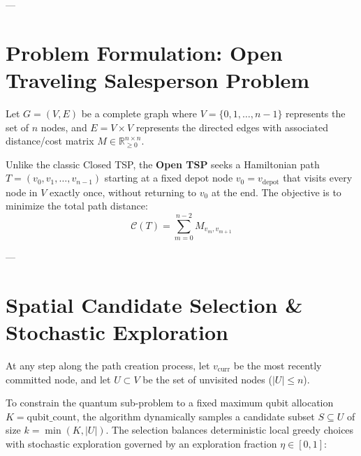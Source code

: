 \documentclass[11pt,a4paper]{article}
\begin{document}
---

\section{Problem Formulation: Open Traveling Salesperson Problem}

Let $G = (V, E)$ be a complete graph where $V = \{0, 1, \dots, n-1\}$ represents the set of $n$ nodes, and $E = V \times V$ represents the directed edges with associated distance/cost matrix $M \in \mathbb{R}_{\ge 0}^{n \times n}$. 

Unlike the classic Closed TSP, the \textbf{Open TSP} seeks a Hamiltonian path $T = (v_0, v_1, \dots, v_{n-1})$ starting at a fixed depot node $v_0 = v_{\text{depot}}$ that visits every node in $V$ exactly once, without returning to $v_0$ at the end. The objective is to minimize the total path distance:
\begin{equation}
\mathcal{C}(T) = \sum_{m=0}^{n-2} M_{v_m, v_{m+1}}
\end{equation}

---

\section{Spatial Candidate Selection \& Stochastic Exploration}

At any step along the path creation process, let $v_{\text{curr}}$ be the most recently committed node, and let $U \subset V$ be the set of unvisited nodes ($|U| \le n$). 

To constrain the quantum sub-problem to a fixed maximum qubit allocation $K = \text{qubit\_count}$, the algorithm dynamically samples a candidate subset $S \subseteq U$ of size $k = \min(K, |U|)$. The selection balances deterministic local greedy choices with stochastic exploration governed by an exploration fraction $\eta \in [0, 1]$:
\end{document}
